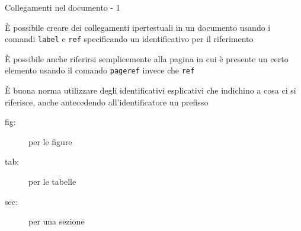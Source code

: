 \begin{frame}{Collegamenti nel documento - 1}

È possibile creare dei collegamenti ipertestuali in un documento usando i 
comandi \texttt{label} e \texttt{ref} specificando un identificativo per il 
riferimento

\vfill

È possibile anche riferirsi semplicemente alla pagina in cui è presente un
certo elemento usando il comando \texttt{pageref} invece che \texttt{ref}

\vfill

È buona norma utilizzare degli identificativi esplicativi che indichino a cosa
ci si riferisce, anche antecedendo all'identificatore un prefisso
\begin{description}
	\item [fig:] per le figure
	\item [tab:] per le tabelle
	\item [sec:] per una sezione
\end{description}

\end{frame}